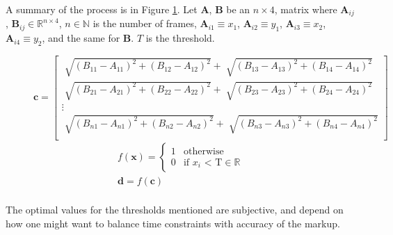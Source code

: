     A summary of the process is in Figure \ref{fig:roiprocessing}. Let $\pmb{A}$, $\pmb{B}$ be an $n \times 4$, matrix where $\pmb{A}_{ij}$, $\pmb{B}_{ij} \in \mathbb{R}^{n \times 4}$, $n \in \mathbb{N}$ is the number of frames, ${\pmb{A}}_{i1} \equiv x_1$, ${\pmb{A}}_{i2} \equiv y_1$, ${\pmb{A}}_{i3} \equiv x_2$, ${\pmb{A}}_{i4} \equiv y_2$, and the same for $\pmb{B}$. $T$ is the threshold.

    \begin{figure}[h]
        \centering
        
        \[
        \pmb{c}=
        \begin{bmatrix}
            \sqrt[]{{(B_{11} - A_{11})}^2 + {(B_{12} - A_{12})}^2} + \sqrt[]{{(B_{13} - A_{13})}^2 + {(B_{14} - A_{14})}^2} \\
            \sqrt[]{{(B_{21} - A_{21})}^2 + {(B_{22} - A_{22})}^2} + \sqrt[]{{(B_{23} - A_{23})}^2 + {(B_{24} - A_{24})}^2} \\
            \vdots \\
            \sqrt[]{{(B_{n1} - A_{n1})}^2 + {(B_{n2} - A_{n2})}^2} + \sqrt[]{{(B_{n3} - A_{n3})}^2 + {(B_{n4} - A_{n4})}^2} \\
        \end{bmatrix}
        \]
        \begin{gather*}
            f(\pmb{x})=
        \begin{cases}
        1      & \text{otherwise}\\
        0      & \text{if $x_i$ < T} \in \mathbb{R} 
        \end{cases} \\
        \pmb{d} = f(\pmb{c}) \\
        \end{gather*}
        \caption{}
        \label{fig:roiprocessing}
    \end{figure} 

    The optimal values for the thresholds mentioned are subjective, and depend on how one might want to balance time constraints with accuracy of the markup.